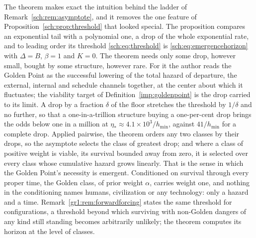 \begin{remark}\label{sch:rem:emergence}
The theorem makes exact the intuition behind the ladder of
Remark~\ref{sch:rem:asymptote}, and it removes the one feature of
Proposition~\ref{sch:prop:threshold} that looked special. The
proposition compares an exponential tail with a polynomial one, a drop
of the whole exponential rate, and to leading order its threshold
\eqref{sch:eq:threshold} is \eqref{sch:eq:emergencehorizon} with
$\Delta=B$, $\beta=1$ and $K=0$. The theorem needs only some
drop, however small, bought by some structure, however rare. For it the
author reads the Golden Point as the successful lowering of the total
hazard of departure, the external, internal and schedule channels
together, at the center about which it fluctuates; the viability target
of Definition~\ref{imp:goldenpoint} is the drop carried to its limit. A
drop by a fraction $\delta$ of the floor stretches the threshold by
$1/\delta$ and no further, so that a one-in-a-trillion structure buying
a one-per-cent drop brings the odds below one in a million at
$\eta_\ast\approx4.1\times10^{3}/h_{\min}$, against $41/h_{\min}$ for a
complete drop. Applied pairwise, the theorem orders any two classes by
their drops, so the asymptote selects the class of greatest drop; and
where a class of positive weight is viable, its survival bounded away
from zero, it is selected over every class whose cumulative hazard grows
linearly. That is the sense in which the Golden Point's necessity is
emergent. Conditioned on survival through every proper time, the Golden
class, of prior weight $\alpha$, carries weight one, and nothing in the
conditioning names humans, civilization or any technology: only a hazard
and a time. Remark~\ref{gr1:rem:forwardforcing} states the same
threshold for configurations, a threshold beyond
which surviving with non-Golden dangers of any kind still standing
becomes arbitrarily unlikely; the theorem computes its horizon at the
level of classes.


\end{remark}
